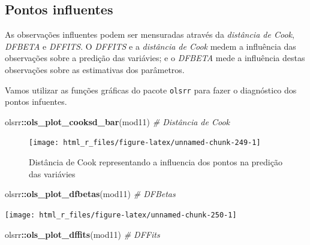 \documentclass[
]{book}
\newenvironment{Shaded}{\begin{snugshade}}{\end{snugshade}}
\newcommand{\CommentTok}[1]{\textcolor[rgb]{0.56,0.35,0.01}{\textit{#1}}}
\newcommand{\KeywordTok}[1]{\textcolor[rgb]{0.13,0.29,0.53}{\textbf{#1}}}
\newcommand{\NormalTok}[1]{#1}
\newcommand{\OperatorTok}[1]{\textcolor[rgb]{0.81,0.36,0.00}{\textbf{#1}}}
\numberwithin{equation}{section}
\newcommand{\indt}[1]{\index{#1|ST}}
\begin{document}
\hypertarget{pontos-influentes}{%
\subsection{Pontos influentes}\label{pontos-influentes}}

\indt{pontos influentes}

As observações influentes podem ser mensuradas através da \emph{distância de Cook}, \emph{DFBETA} e \emph{DFFITS}. O \emph{DFFITS} e a \emph{distância de Cook} medem a influência das observações sobre a predição das variávies; e o \emph{DFBETA} mede a influência destas observações sobre as estimativas dos parâmetros.

Vamos utilizar as funções gráficas do pacote \texttt{olsrr} para fazer o diagnóstico dos pontos infuentes.

\begin{Shaded}
\begin{Highlighting}[]
\NormalTok{olsrr}\OperatorTok{::}\KeywordTok{ols\_plot\_cooksd\_bar}\NormalTok{(mod11) }\CommentTok{\# Distância de Cook}
\end{Highlighting}
\end{Shaded}

\begin{figure}

{\centering \texttt{[image: html\_r\_files/figure-latex/unnamed-chunk-249-1]} 

}

\caption{Distância de Cook representando a influencia dos pontos na predição das variávies}\label{fig:unnamed-chunk-249}
\end{figure}

\begin{Shaded}
\begin{Highlighting}[]
\NormalTok{olsrr}\OperatorTok{::}\KeywordTok{ols\_plot\_dfbetas}\NormalTok{(mod11) }\CommentTok{\# DFBetas}
\end{Highlighting}
\end{Shaded}

\begin{center}\texttt{[image: html\_r\_files/figure-latex/unnamed-chunk-250-1]} \end{center}

\begin{Shaded}
\begin{Highlighting}[]
\NormalTok{olsrr}\OperatorTok{::}\KeywordTok{ols\_plot\_dffits}\NormalTok{(mod11) }\CommentTok{\# DFFits}
\end{Highlighting}
\end{Shaded}
\end{document}
